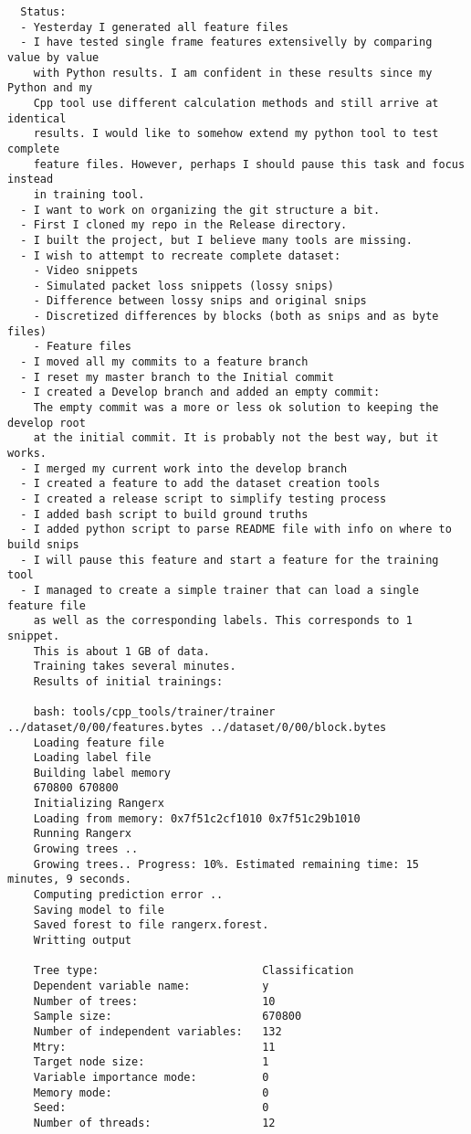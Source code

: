 \documentclass[12pt,oneside]{book}
\begin{document}
\begin{lstlisting}
  Status:
  - Yesterday I generated all feature files
  - I have tested single frame features extensivelly by comparing value by value
    with Python results. I am confident in these results since my Python and my
    Cpp tool use different calculation methods and still arrive at identical
    results. I would like to somehow extend my python tool to test complete
    feature files. However, perhaps I should pause this task and focus instead
    in training tool.
  - I want to work on organizing the git structure a bit.
  - First I cloned my repo in the Release directory.
  - I built the project, but I believe many tools are missing.
  - I wish to attempt to recreate complete dataset:
    - Video snippets
    - Simulated packet loss snippets (lossy snips)
    - Difference between lossy snips and original snips
    - Discretized differences by blocks (both as snips and as byte files)
    - Feature files
  - I moved all my commits to a feature branch
  - I reset my master branch to the Initial commit
  - I created a Develop branch and added an empty commit:
    The empty commit was a more or less ok solution to keeping the develop root
    at the initial commit. It is probably not the best way, but it works.
  - I merged my current work into the develop branch
  - I created a feature to add the dataset creation tools
  - I created a release script to simplify testing process
  - I added bash script to build ground truths
  - I added python script to parse README file with info on where to build snips
  - I will pause this feature and start a feature for the training tool
  - I managed to create a simple trainer that can load a single feature file
    as well as the corresponding labels. This corresponds to 1 snippet.
    This is about 1 GB of data.
    Training takes several minutes.
    Results of initial trainings:
    
    bash: tools/cpp_tools/trainer/trainer ../dataset/0/00/features.bytes ../dataset/0/00/block.bytes 
    Loading feature file
    Loading label file
    Building label memory
    670800 670800
    Initializing Rangerx
    Loading from memory: 0x7f51c2cf1010 0x7f51c29b1010
    Running Rangerx
    Growing trees ..
    Growing trees.. Progress: 10%. Estimated remaining time: 15 minutes, 9 seconds.
    Computing prediction error ..
    Saving model to file
    Saved forest to file rangerx.forest.
    Writting output
    
    Tree type:                         Classification
    Dependent variable name:           y
    Number of trees:                   10
    Sample size:                       670800
    Number of independent variables:   132
    Mtry:                              11
    Target node size:                  1
    Variable importance mode:          0
    Memory mode:                       0
    Seed:                              0
    Number of threads:                 12
    

\end{lstlisting}
\end{document}
